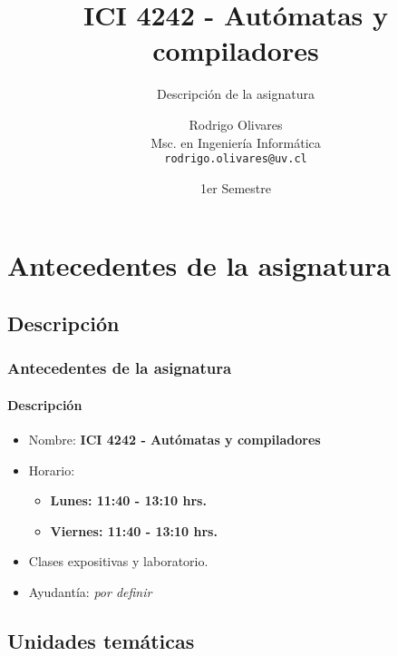 \documentclass{beamer}
\title[\textbf{ICI 4242 - Aut\'omatas y compiladores}]{\textbf{ICI 4242 - Aut\'omatas y compiladores}}
\subtitle{Descripci\'on de la asignatura}
\author[Rodrigo Olivares]
{
    Rodrigo Olivares \\
    \vspace{0.5mm}
    Msc. en Ingenier\'ia Inform\'atica \\
    \vspace{0.5mm}
    \texttt{\normalsize rodrigo.olivares@uv.cl}
}
\institute[PUCV]
\date{1er Semestre}
\begin{document}
    \begin{frame}
        \titlepage
    \end{frame}


    \section{Antecedentes de la asignatura}

        \subsection{Descripci\'on}

        \begin{frame}
            \frametitle{Antecedentes de la asignatura}
            \framesubtitle{Descripci\'on}

            \begin{itemize}
                \item Nombre: \textbf{ICI 4242 - Aut\'omatas y compiladores}
                \item Horario: 
                \begin{itemize}
                    \item \textbf{Lunes: 11:40 - 13:10 hrs.}
                    \item \textbf{Viernes: 11:40 - 13:10 hrs.}
                \end{itemize}
                \item Clases expositivas y laboratorio.
                \item Ayudant\'ia: \emph{por definir}
            \end{itemize}
        \end{frame}

        \subsection{Unidades tem\'aticas}
\end{document}
